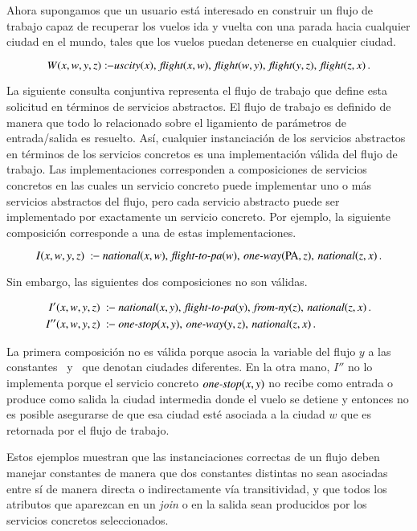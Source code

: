Ahora supongamos que un usuario está interesado en construir un flujo de trabajo
capaz de recuperar los vuelos ida y vuelta con una parada hacia cualquier ciudad
en el mundo, tales que los vuelos puedan detenerse en cualquier ciudad.

\[ W(x,w,y,z) :\!\!- \text{\it uscity}(x),\,\text{\it flight}(x,w),\,\text{\it flight}(w,y),\,\text{\it flight}(y,z),\,\text{\it flight}(z,x)\,. \]

La siguiente consulta conjuntiva representa el flujo de trabajo que define esta
solicitud en términos de servicios abstractos. El flujo de trabajo es definido
de manera que todo lo relacionado sobre el ligamiento de parámetros de
entrada/salida es resuelto. Así, cualquier instanciación de los servicios
abstractos en términos de los servicios concretos es una implementación válida
del flujo de trabajo. Las implementaciones corresponden a composiciones de
servicios concretos en las cuales un servicio concreto puede implementar uno o
más servicios abstractos del flujo, pero cada servicio abstracto puede ser
implementado por exactamente un servicio concreto. Por ejemplo, la siguiente
composición corresponde a una de estas implementaciones.

\[ I(x,w,y,z)\ \qrule\ \national(x,w),\,\flightPA(w),\,\oneway(\PA,z),\,\national(z,x)\,. \]

Sin embargo, las siguientes dos composiciones no son válidas.

\begin{alignat*}{1}
I'(x,w,y,z)\  \qrule\ &\national(x,y),\,\flightPA(y),\,\fromNY(z),\,\national(z,x)\,. \\
I''(x,w,y,z)\ \qrule\ &\onestop(x,y),\,\oneway(y,z),\,\national(z,x)\,.
\end{alignat*}

La primera composición no es válida porque asocia la variable del flujo $y$ a
las constantes \PA\ y \NY\ que denotan ciudades diferentes. En la otra mano, $I''$
no lo implementa porque el servicio concreto $\text{\it one-stop}(x,y)$ no recibe como entrada
o produce como salida la ciudad intermedia donde el vuelo se detiene y entonces
no es posible asegurarse de que esa ciudad esté asociada a la ciudad $w$ que es
retornada por el flujo de trabajo.

Estos ejemplos muestran que las instanciaciones correctas de un flujo deben
manejar constantes de manera que dos constantes distintas no sean asociadas
entre sí de manera directa o indirectamente vía transitividad, y que todos los
atributos que aparezcan en un \emph{join} o en la salida sean producidos por los
servicios concretos seleccionados.


